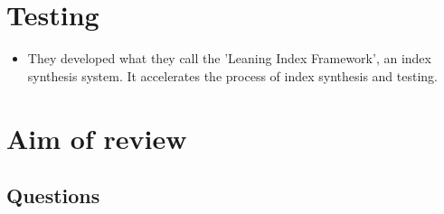 \documentclass[presentation]{beamer}
\begin{document}
\section{Testing}
\label{sec:org3fd13e5}
\begin{itemize}
\item They developed what they call the 'Leaning Index Framework', an index synthesis system.
It accelerates the process of index synthesis and testing.
\end{itemize}

\section{Aim of review}
\label{sec:orgbc25655}
\subsection{Questions}
\label{sec:orgc7dfd98}
\end{document}
